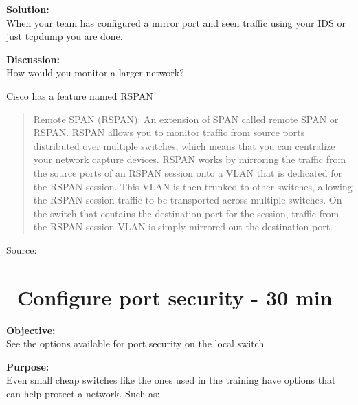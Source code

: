 \documentclass[a4paper,11pt,notitlepage]{report}
\begin{document}
{\bf Solution:}\\
When your team has configured a mirror port and seen traffic using your IDS or just tcpdump you are done.

{\bf Discussion:}\\
How would you monitor a larger network?

Cisco has a feature named RSPAN

\begin{quote}
Remote SPAN (RSPAN): An extension of SPAN called remote SPAN or RSPAN. RSPAN allows you to monitor traffic from source ports distributed over multiple switches, which means that you can centralize your network capture devices. RSPAN works by mirroring the traffic from the source ports of an RSPAN session onto a VLAN that is dedicated for the RSPAN session. This VLAN is then trunked to other switches, allowing the RSPAN session traffic to be transported across multiple switches. On the switch that contains the destination port for the session, traffic from the RSPAN session VLAN is simply mirrored out the destination port.
\end{quote}
Source: {\small{}}



\chapter{\faInfoCircle\ Configure port security - 30 min}
\label{ex:port-security}

{\bf Objective:}\\
See the options available for port security on the local switch

{\bf Purpose:}\\
Even small cheap switches like the ones used in the training have options that can help protect a network. Such as:
\end{document}

